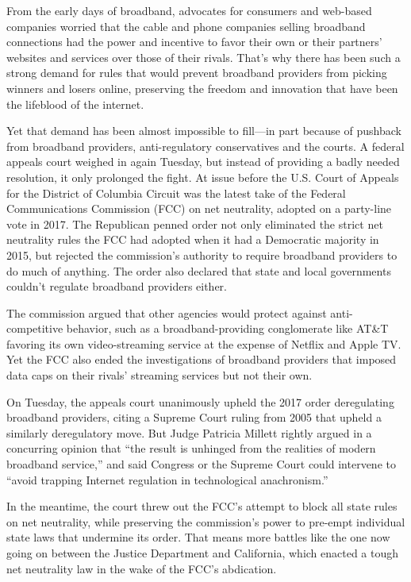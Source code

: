 From the early days of broadband, advocates for consumers and web-based
companies worried that the cable and phone companies selling broadband
connections had the power and incentive to favor their own or their
partners' websites and services over those of their rivals. That's why
there has been such a strong demand for rules that would prevent
broadband providers from picking winners and losers online, preserving
the freedom and innovation that have been the lifeblood of the internet.

Yet that demand has been almost impossible to fill---in part because
of pushback from broadband providers, anti-regulatory conservatives and
the courts. A federal appeals court weighed in again Tuesday, but
instead of providing a badly needed resolution, it only prolonged the
fight. At issue before the U.S. Court of Appeals for the District of
Columbia Circuit was the latest take of the Federal Communications
Commission (FCC) on net neutrality, adopted on a party-line vote in 2017. The
Republican penned order not only eliminated the strict net neutrality
rules the FCC had adopted when it had a Democratic majority in 2015, but
rejected the commission's authority to require broadband providers to do
much of anything. The order also declared that state and local
governments couldn't regulate broadband providers either.

The commission argued that other agencies would protect against
anti-competitive behavior, such as a broadband-providing conglomerate
like AT\&T favoring its own video-streaming service at the expense of
Netflix and Apple TV. Yet the FCC also ended the investigations of
broadband providers that imposed data caps on their rivals' streaming
services but not their own.

On Tuesday, the appeals court unanimously upheld the 2017 order
deregulating broadband providers, citing a Supreme Court ruling from
2005 that upheld a similarly deregulatory move. But Judge Patricia
Millett rightly argued in a concurring opinion that ``the result is
unhinged from the realities of modern broadband service,'' and said
Congress or the Supreme Court could intervene to ``avoid trapping
Internet regulation in technological anachronism.''

In the meantime, the court threw out the FCC's attempt to block all
state rules on net neutrality, while preserving the commission's power
to pre-empt individual state laws that undermine its order. That means
more battles like the one now going on between the Justice Department
and California, which enacted a tough net neutrality law in the wake of
the FCC's abdication.

